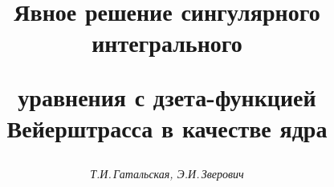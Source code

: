 




%





\newcommand{\re}{\operatorname{Re}}


\newcommand{\cth}{\operatorname{cth}}


\newcommand{\im}{\operatorname{Im}}


\newcommand{\tts}[1]{}







\setcounter{page}{15}















\author{\it Т.И.\,Гатальская, Э.И.\,Зверович}




\title{Явное решение сингулярного интегрального


уравнения с дзета-функцией Вейерштрасса в качестве ядра}





\date{}




\pagestyle{plain} %







\maketitle


